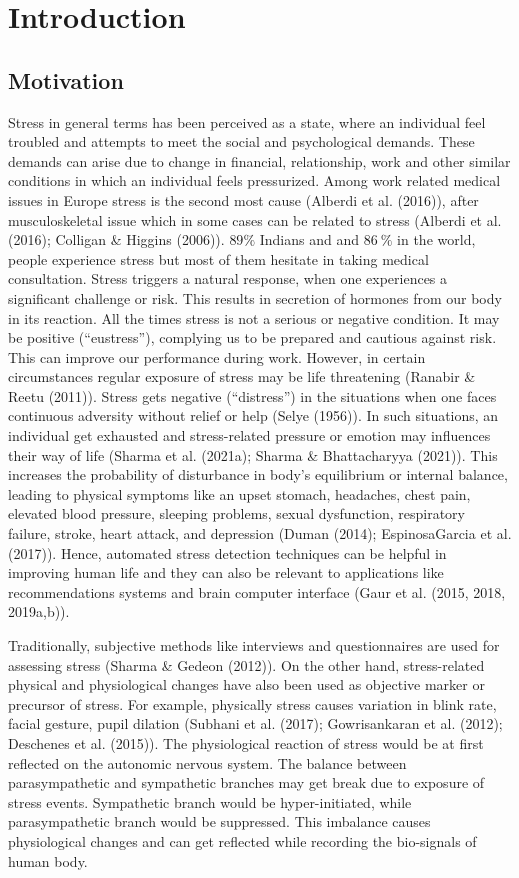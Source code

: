 \section{Introduction}

\subsection{Motivation}

Stress in general terms has been perceived as a state, where an individual feel troubled and attempts to meet the social and psychological demands. These demands can arise due to change in financial, relationship, work and other similar conditions in which an individual feels pressurized. Among work related medical issues in Europe stress is the second most cause (Alberdi et al. (2016)), after musculoskeletal issue which in some cases can be related to stress (Alberdi et al. (2016); Colligan \& Higgins (2006)). $89\%$ Indians and and $86~\%$ in the world, people experience stress but most of them hesitate in taking medical consultation. Stress triggers a natural response, when one experiences a significant challenge or risk. This results in secretion of hormones from our body in its reaction. All the times stress is not a serious or negative condition. It may be positive (“eustress”), complying us to be prepared and cautious against risk. This can improve our performance during work. However, in certain circumstances regular exposure of stress may be life threatening (Ranabir \& Reetu (2011)). Stress gets negative (“distress”) in the situations when one faces continuous adversity without relief or help (Selye (1956)). In such situations, an individual get exhausted and stress-related pressure or emotion may influences their way of life (Sharma et al. (2021a); Sharma \& Bhattacharyya (2021)). This increases the probability of disturbance in body’s equilibrium or internal balance, leading to physical symptoms like an upset stomach, headaches, chest pain, elevated blood pressure, sleeping problems, sexual dysfunction, respiratory failure, stroke, heart attack, and depression (Duman (2014); EspinosaGarcia et al. (2017)). Hence, automated stress detection techniques can be helpful in improving human life and they can also be relevant to applications like recommendations systems and brain computer interface (Gaur et al. (2015, 2018, 2019a,b)).

Traditionally, subjective methods like interviews and questionnaires are used for assessing stress (Sharma \& Gedeon (2012)). On the other hand, stress-related physical and physiological changes have also been used as objective marker or precursor of stress. For example, physically stress causes variation in blink rate, facial gesture, pupil dilation (Subhani et al. (2017); Gowrisankaran et al. (2012); Deschenes et al. (2015)). The physiological reaction of stress would be at first reflected on the autonomic nervous system. The balance between parasympathetic and sympathetic branches may get break due to exposure of stress events. Sympathetic branch would be hyper-initiated, while parasympathetic branch would be suppressed. This imbalance causes physiological changes and can get reflected while recording the bio-signals of human body.

